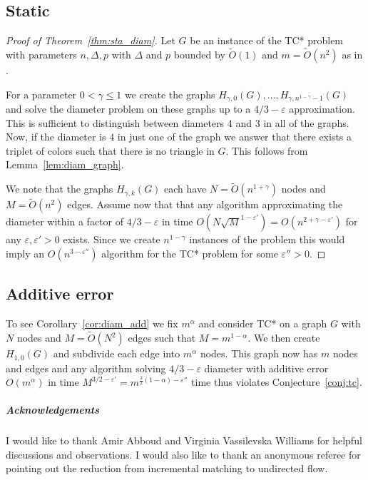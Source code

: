 \documentclass[a4paper,11pt]{article}
\newcommand{\eps}{\varepsilon}
\newcommand{\Ot}{\tilde{O}}
\theoremstyle{definition}
\begin{document}
\subsection{Static}
\begin{proof}[Proof of Theorem~\ref{thm:sta_diam}]
    Let $G$ be an instance of the TC* problem with parameters $n,\Delta,p$ with
    $\Delta$ and $p$ bounded by $\Ot(1)$ and $m = \Ot(n^2)$ as in
    \cite{AbboudVY15}.

    For a parameter $0 < \gamma\le 1$ we
    create the graphs $H_{\gamma, 0}(G), \ldots, H_{\gamma, n^{1-\gamma}
    -1}(G)$ and solve the diameter problem on these graphs up to a $4/3-\eps$
    approximation. This is sufficient to distinguish between diameters $4$ and
    $3$ in all of the graphs. Now, if the diameter is $4$ in just one of the
    graph we answer that there exists a triplet of colors such that there is no
    triangle in $G$. This follows from Lemma~\ref{lem:diam_graph}.

    We note that the graphs $H_{\gamma, k}(G)$ each have $N = \Ot(n^{1+\gamma})$
    nodes and $M = \Ot(n^2)$ edges. Assume now that that any algorithm
    approximating the diameter within a factor of $4/3-\eps$ in time
    $O(N\sqrt{M}^{1-\eps'}) = O(n^{2+\gamma-\eps'})$ for any $\eps,\eps' > 0$
    exists. Since we create $n^{1-\gamma}$ instances of the problem this would
    imply an $O(n^{3-\eps''})$ algorithm for the TC* problem for some $\eps'' >
    0$.
\end{proof}

\subsection{Additive error}
To see Corollary~\ref{cor:diam_add} we fix $m^\alpha$ and consider TC* on a
graph $G$ with $N$ nodes and $M = \Ot(N^2)$ edges such that $M = m^{1-\alpha}$.
We then create $H_{1, 0}(G)$ and subdivide each edge into $m^\alpha$ nodes.
This graph now has $m$ nodes and edges and any algorithm solving $4/3-\eps$
diameter with additive error $O(m^\alpha)$ in time $M^{3/2-\eps'} =
m^{\frac{3}{2}(1-\alpha) - \eps''}$ time thus violates
Conjecture~\ref{conj:tc}.

\subparagraph*{Acknowledgements}
I would like to thank Amir Abboud and Virginia Vassilevska Williams for helpful
discussions and observations. I would also like to thank an anonymous referee
for pointing out the reduction from incremental matching to undirected flow.






\end{document}
